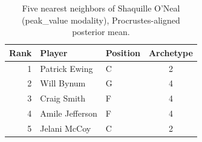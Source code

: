 \begin{table}[htbp]
  \centering\small
  \begin{tabular}{rllc}
    \toprule
    Rank & Player & Position & Archetype \\
    \midrule
    1 & Patrick Ewing & C & 2 \\
    2 & Will Bynum & G & 4 \\
    3 & Craig Smith & F & 4 \\
    4 & Amile Jefferson & F & 4 \\
    5 & Jelani McCoy & C & 2 \\
    \bottomrule
  \end{tabular}
  \caption{Five nearest neighbors of Shaquille O'Neal (peak_value modality), Procrustes-aligned posterior mean.}
  \label{tab:Shaquille_O_Neal_neighbors_peak_value}
\end{table}

